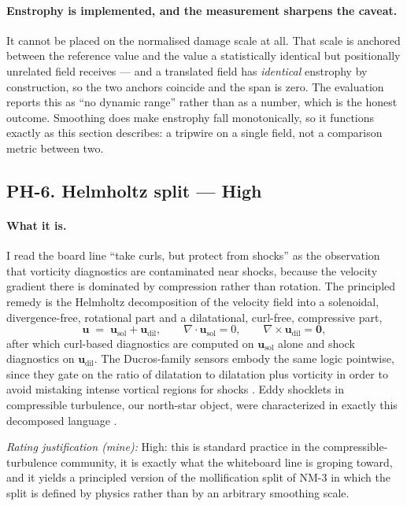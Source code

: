 \documentclass[11pt]{article}
\newcommand{\High}{\textbf{High}}
\newcommand{\rating}[1]{\par\smallskip\noindent\textit{Rating justification (mine):} #1}
\begin{document}
\paragraph{Enstrophy is implemented, and the measurement sharpens the caveat.} It cannot be
placed on the normalised damage scale at all. That scale is anchored between the reference
value and the value a statistically identical but positionally unrelated field receives ---
and a translated field has \emph{identical} enstrophy by construction, so the two anchors
coincide and the span is zero. The evaluation reports this as ``no dynamic range'' rather
than as a number, which is the honest outcome. Smoothing does make enstrophy fall
monotonically, so it functions exactly as this section describes: a tripwire on a single
field, not a comparison metric between two.

\subsection{PH-6. Helmholtz split --- \High{}}

\paragraph{What it is.} I read the board line ``take curls, but protect from shocks'' as the
observation that vorticity diagnostics are contaminated near shocks, because the velocity
gradient there is dominated by compression rather than rotation. The principled remedy is the
Helmholtz decomposition of the velocity field into a solenoidal, divergence-free, rotational
part and a dilatational, curl-free, compressive part,
\begin{equation}
\mathbf{u} \;=\; \mathbf{u}_{\text{sol}} + \mathbf{u}_{\text{dil}},
\qquad \nabla\cdot\mathbf{u}_{\text{sol}} = 0,
\qquad \nabla\times\mathbf{u}_{\text{dil}} = \mathbf{0},
\end{equation}
after which curl-based diagnostics are computed on $\mathbf{u}_{\text{sol}}$ alone and shock
diagnostics on $\mathbf{u}_{\text{dil}}$. The Ducros-family sensors embody the same logic
pointwise, since they gate on the ratio of dilatation to dilatation plus vorticity in order
to avoid mistaking intense vortical regions for shocks \cite{ducros1999}. Eddy shocklets in
compressible turbulence, our north-star object, were characterized in exactly this
decomposed language \cite{lee1991}.

\rating{High: this is standard practice in the compressible-turbulence community, it is
exactly what the whiteboard line is groping toward, and it yields a principled version of
the mollification split of NM-3 in which the split is defined by physics rather than by an
arbitrary smoothing scale.}
\end{document}
